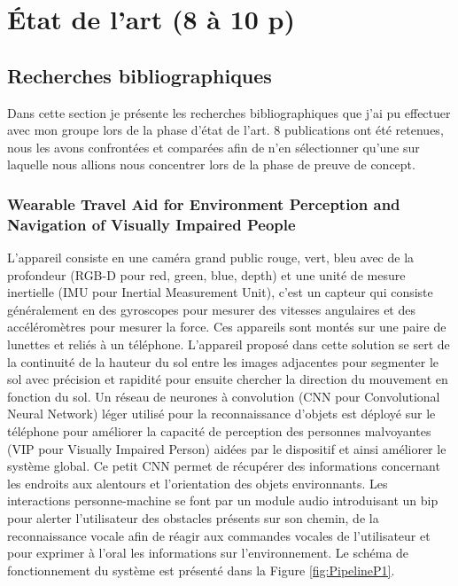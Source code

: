 \documentclass[11pt]{article}
\begin{document}
  \section{État de l'art (8 à 10 p)}  
  \subsection{Recherches bibliographiques}
  
  Dans cette section je présente les recherches bibliographiques que j'ai pu effectuer avec mon groupe lors de la phase d'état de l'art.
  8 publications ont été retenues, nous les avons confrontées et comparées afin de n'en sélectionner qu'une sur laquelle nous allions nous 
  concentrer lors de la phase de preuve de concept. 

  \subsubsection{Wearable Travel Aid for Environment Perception and Navigation of
  Visually Impaired People}

  L'appareil consiste en une caméra grand public rouge, vert, bleu avec de la profondeur (RGB-D pour red, green, blue, depth)
  et une unité de mesure inertielle (IMU pour Inertial Measurement Unit), c'est un capteur qui consiste généralement en des gyroscopes 
  pour mesurer des vitesses angulaires et des accéléromètres pour mesurer la force. Ces appareils sont montés sur une paire de lunettes
  et reliés à un téléphone. L'appareil proposé dans cette solution se sert de la continuité de la hauteur du sol entre les images adjacentes
  pour segmenter le sol avec précision et rapidité pour ensuite chercher la direction du mouvement en fonction du sol.
  Un réseau de neurones à convolution (CNN pour Convolutional Neural Network) léger utilisé pour la reconnaissance d'objets est 
  déployé sur le téléphone pour améliorer la capacité de perception des personnes malvoyantes (VIP pour Visually Impaired Person) aidées 
  par le dispositif et ainsi améliorer le système global. Ce petit CNN permet de récupérer des informations concernant les endroits 
  aux alentours et l'orientation des objets environnants. Les interactions personne-machine se font par un module audio introduisant un bip 
  pour alerter l'utilisateur des obstacles présents sur son chemin, de la reconnaissance vocale afin de réagir aux commandes vocales 
  de l'utilisateur et pour exprimer à l'oral les informations sur l'environnement. Le schéma de fonctionnement du système est présenté dans 
  la Figure \ref{fig:PipelineP1}.
\end{document}
